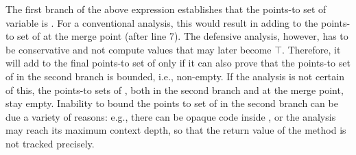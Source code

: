 The first branch of the above  expression establishes that the
points-to set of variable  is . For a conventional
analysis, this would result in adding  to the points-to set of
 at the merge point (after line 7). The defensive analysis, however,
has to be conservative and not compute values that may later become
$\top$. Therefore, it will add  to the final
points-to set of  only if it can also prove that the points-to
set of  in the second branch is bounded, i.e., non-empty. If the analysis is not
certain of this, the points-to sets of , both in the second
branch and at the merge point, stay empty. Inability to
bound the points to set of  in the second branch can be due a
variety of reasons: e.g., there can be opaque code inside
, or the analysis may reach its maximum context
depth, so that the return value of the method is not tracked
precisely.







%




